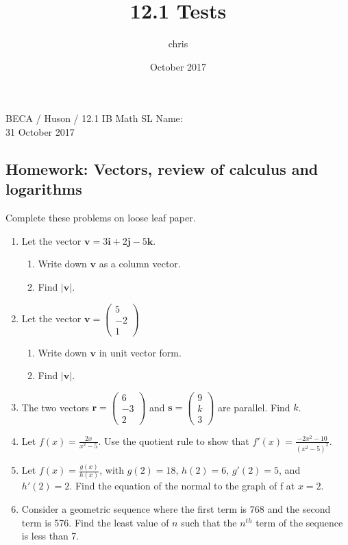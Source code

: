 \documentclass{article}
\title{12.1 Tests}
\author{chris }
\date{October 2017}
\begin{document}
\noindent BECA / Huson / 12.1 IB Math SL \qquad \qquad Name:\\
31 October 2017
\subsection*{Homework: Vectors, review of calculus and logarithms}
Complete these problems on loose leaf paper.

\begin{enumerate}

\item Let the vector $\mathbf{v} = 3 \mathbf{i} + 2 \mathbf{j} -5 \mathbf{k}$. 
\begin{enumerate}
    \item Write down $\mathbf{v}$ as a column vector.
    \item Find $| \mathbf{v}|$.
\end{enumerate}

\item Let the vector $\mathbf{v}= \left(
      \begin{array}{c}
        5\\
        -2\\
        1
      \end{array} \right)$
\begin{enumerate}
    \item Write down $\mathbf{v}$ in unit vector form.
    \item Find $| \mathbf{v}|$.
\end{enumerate}

\item The two vectors $\mathbf{r}= \left(
      \begin{array}{c}
        6\\
        -3\\
        2
      \end{array} \right)$ and 
      $\mathbf{s}= \left(
      \begin{array}{c}
        9\\
        k\\
        3
      \end{array} \right)$ are parallel. Find $k$.
      
\item Let $\displaystyle f(x)= \frac{2x}{x^2-5}$. Use the quotient rule to show that $\displaystyle f'(x)= \frac{-2x^2-10}{(x^2-5)^2}$.

\item Let $\displaystyle f(x) = \frac{g(x)}{h(x)}$, with $g(2)=18$, $h(2)=6$, $g'(2)=5$, and $h'(2)=2$. Find the equation of the normal to the graph of f at $x=2$. 

\item Consider a geometric sequence where the first term is 768 and the second term is 576. Find the least value of $n$ such that the $n^{th}$ term of the sequence is less than 7.

\end{enumerate}
\end{document}
